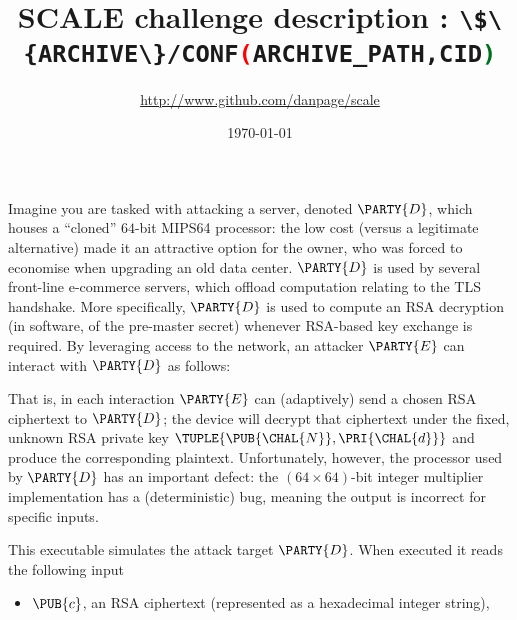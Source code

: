 \documentclass[crop={false},multi={true},tikz={true}]{standalone}
\begin{document}

\ifstandalone
\author{\url{http://www.github.com/danpage/scale}}
\title{\Large SCALE challenge description : \lstinline[language={bash}]|\$\{ARCHIVE\}/CONF(ARCHIVE_PATH,CID)|}
\date{\today}

\maketitle
\fi



Imagine you are tasked with attacking a server, denoted $\PARTY{D}$, 
which houses a ``cloned'' $64$-bit MIPS64 processor: the low cost (versus a 
legitimate alternative) made it an attractive option for the owner, who was
forced to economise when upgrading an old data center.
$\PARTY{D}$ is used by several front-line e-commerce servers, which offload
computation relating to the TLS handshake.  More specifically, $\PARTY{D}$ 
is used to compute an RSA decryption (in software, of the pre-master secret)
whenever RSA-based key exchange is required.
By leveraging access to the network, 
an attacker $\PARTY{E}$ can interact with $\PARTY{D}$ as follows:

\begin{center}

\end{center}

\noindent
That is, in each interaction $\PARTY{E}$ can (adaptively) send 
a chosen RSA ciphertext
to $\PARTY{D}$; the device will
decrypt that ciphertext under the fixed, unknown RSA private key $\TUPLE{ \PUB{\CHAL{N}}, \PRI{\CHAL{d}} }$ 
and produce 
the corresponding  plaintext.
Unfortunately, however, the processor used by $\PARTY{D}$ has an important
defect: the $( 64 \times 64 )$-bit integer multiplier implementation has a
(deterministic) bug, meaning the output is incorrect for specific inputs.



This executable simulates the attack target $\PARTY{D}$.  When executed it 
reads the following input

\begin{itemize}
\item $\PUB{c}$,
      an RSA ciphertext
      (represented as a                   hexadecimal integer string),
\end{itemize}
\end{document}
